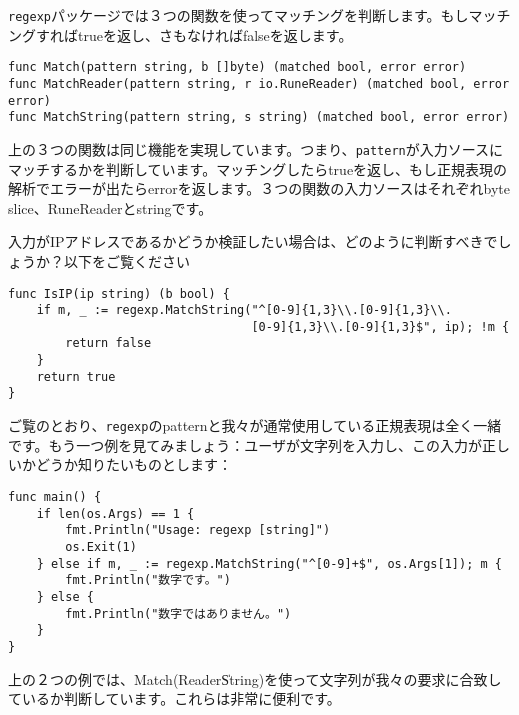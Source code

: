 \texttt{regexp}パッケージでは３つの関数を使ってマッチングを判断します。もしマッチングすればtrueを返し、さもなければfalseを返します。

\begin{lstlisting}[numbers=none]
func Match(pattern string, b []byte) (matched bool, error error)
func MatchReader(pattern string, r io.RuneReader) (matched bool, error error)
func MatchString(pattern string, s string) (matched bool, error error)
\end{lstlisting}

上の３つの関数は同じ機能を実現しています。つまり、\texttt{pattern}が入力ソースにマッチするかを判断しています。マッチングしたらtrueを返し、もし正規表現の解析でエラーが出たらerrorを返します。３つの関数の入力ソースはそれぞれbyte slice、RuneReaderとstringです。

入力がIPアドレスであるかどうか検証したい場合は、どのように判断すべきでしょうか？以下をご覧ください

\begin{lstlisting}[numbers=none]
func IsIP(ip string) (b bool) {
    if m, _ := regexp.MatchString("^[0-9]{1,3}\\.[0-9]{1,3}\\.
                                  [0-9]{1,3}\\.[0-9]{1,3}$", ip); !m {
        return false
    }
    return true
}
\end{lstlisting}

ご覧のとおり、\texttt{regexp}のpatternと我々が通常使用している正規表現は全く一緒です。もう一つ例を見てみましょう：ユーザが文字列を入力し、この入力が正しいかどうか知りたいものとします：



\begin{lstlisting}[numbers=none]
func main() {
    if len(os.Args) == 1 {
        fmt.Println("Usage: regexp [string]")
        os.Exit(1)
    } else if m, _ := regexp.MatchString("^[0-9]+$", os.Args[1]); m {
        fmt.Println("数字です。")
    } else {
        fmt.Println("数字ではありません。")
    }
}
\end{lstlisting}

上の２つの例では、Match(Reader\|String)を使って文字列が我々の要求に合致しているか判断しています。これらは非常に便利です。

